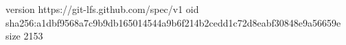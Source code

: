 version https://git-lfs.github.com/spec/v1
oid sha256:a1dbf9568a7c9b9db165014544a9b6f214b2cedd1c72d8eabf30848e9a56659e
size 2153
